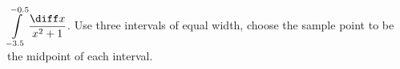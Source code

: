\label{problemRiemannSum-1div1plusxsquared} $\displaystyle \int\limits_{-3.5}^{-0.5} \frac{\diff x}{x^2+1} $. Use three intervals of equal width, choose the sample point to be the midpoint of each interval. 

